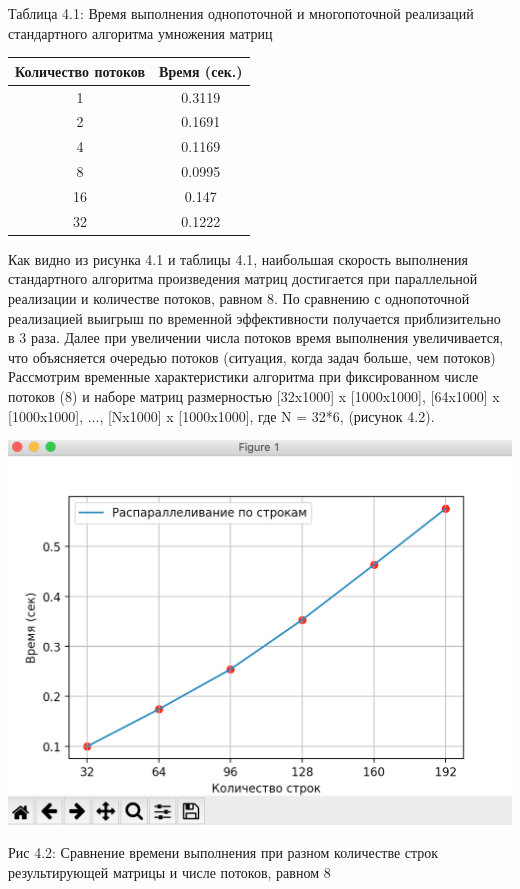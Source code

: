 \documentclass[12pt]{report}
\begin{document}
\begin{center}
	\centering
	\caption{Таблица 4.1: Время выполнения однопоточной и многопоточной реализаций стандартного алгоритма умножения матриц}
	\begin{tabular}{|c c|}
		\hline
		Количество потоков & Время  (сек.) \\ [0.5ex] 
 		\hline\hline
		1 & 0.3119\\
 		\hline
 		2 & 0.1691\\
 		\hline
 		4 & 0.1169\\
 		\hline
		8 & 0.0995\\
		\hline
		16 & 0.147\\
		\hline
		32 & 0.1222\\
		\hline
		\end{tabular}
\end{center} 

Как видно из рисунка 4.1 и таблицы 4.1, наибольшая скорость выполнения стандартного алгоритма произведения матриц достигается при параллельной реализации и количестве потоков, равном 8. По сравнению с однопоточной реализацией выигрыш по временной эффективности получается приблизительно в 3 раза. Далее при увеличении числа потоков время выполнения увеличивается, что объясняется очередью потоков (ситуация, когда задач больше, чем потоков)
Рассмотрим временные характеристики алгоритма при фиксированном числе потоков (8) и наборе матриц размерностью [32x1000] x [1000x1000], [64x1000] x [1000x1000], ..., [Nx1000] x [1000x1000], где N = 32*6, (рисунок 4.2).

\begin{center}
		\includegraphics[scale=0.6]{pics/Parallel2.png}
		
			Рис 4.2: Сравнение времени выполнения при разном количестве строк результирующей матрицы и числе потоков, равном 8
\end{center}
\end{document}

